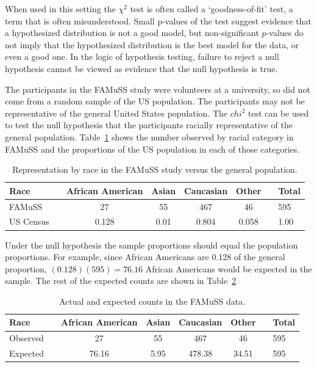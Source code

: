 When used in this setting the $\chi^2$ test is often called a `goodness-of-fit' test, a term that is often misunderstood.  Small p-values of the test suggest evidence that a hypothesized distribution is not a good model, but non-significant $p$-values do not imply that the hypothesized distribution is the best model for the data, or even a good one.  In the logic of hypothesis testing, failure to reject a null hypothesis cannot be viewed as evidence that the null hypothesis is true.

\begin{example} {The participants in the FAMuSS study were volunteers at a university, so did not come from a random sample of the US population.  The participants may not be representative of the general United States population. The $chi^2$ test can be used to test the null hypothesis that the participants racially representative of the general population.  Table~\ref{famussRacialProportions} shows the number observed by racial category in FAMuSS and the proportions of the US population in each of those categories.

\begin{table}[h]
	\centering
	\begin{tabular}{ll ccc c ll}
		\hline
		Race	 & \hspace{2mm} & African American & Asian & Caucasian & Other & \hspace{2mm} & Total \\
		\hline
		FAMuSS &	& 27 & 55 & 467 & 46 & & 595 \\
		US Census	 & 		& 0.128 & 0.01 & 0.804 & 0.058 & & 1.00 \\
		\hline
	\end{tabular}
	\caption{Representation by race in the FAMuSS study versus the general population.}
    \label{famussRacialProportions}
\end{table}
}

Under the null hypothesis the sample proportions should equal the population proportions. For example, since African Americans are 0.128 of the general proportion, $(0.128)(595) = 76.16$ African Americans would be expected in the sample.  The rest of the expected counts are shown in Table~\ref{actualExpectedRacialCountsFamuss}

\begin{table}[h]
	\centering
	\begin{tabular}{ll ccc c ll}
		\hline
		Race	 & \hspace{2mm} & African American & Asian & Caucasian & Other & \hspace{2mm} & Total \\
		\hline
		Observed &	& 27 & 55 & 467 & 46 & & 595 \\
		Expected & 	& 76.16 & 5.95 & 478.38 & 34.51 & & 595 \\
		\hline
	\end{tabular}
	\caption{Actual and expected counts in the FAMuSS data.}
    \label{actualExpectedRacialCountsFamuss}
\end{table}	


\end{example}
